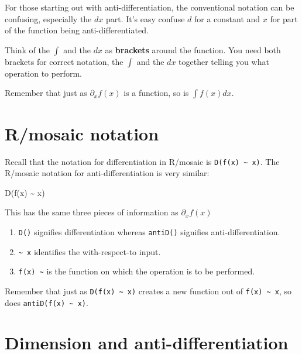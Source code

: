 \documentclass[
  letterpaper,
  DIV=11,
  numbers=noendperiod,
  oneside]{scrreprt}
\newenvironment{Shaded}{\begin{snugshade}}{\end{snugshade}}
\newcommand{\FunctionTok}[1]{\textcolor[rgb]{0.28,0.35,0.67}{#1}}
\newcommand{\NormalTok}[1]{\textcolor[rgb]{0.00,0.46,0.62}{#1}}
\newcommand{\SpecialCharTok}[1]{\textcolor[rgb]{0.37,0.37,0.37}{#1}}
\providecommand{\tightlist}{%
  \setlength{\itemsep}{0pt}\setlength{\parskip}{0pt}}
\begin{document}
For those starting out with anti-differentiation, the conventional
notation can be confusing, especially the \(dx\) part. It's easy confuse
\(d\) for a constant and \(x\) for part of the function being
anti-differentiated.

Think of the \(\int\) and the \(dx\) as \textbf{brackets} around the
function. You need both brackets for correct notation, the \(\int\) and
the \(dx\) together telling you what operation to perform.

Remember that just as \(\partial_x f(x)\) is a function, so is
\(\int f(x) dx\).

\hypertarget{rmosaic-notation}{%
\section{R/mosaic notation}\label{rmosaic-notation}}

Recall that the notation for differentiation in R/mosaic is
\texttt{D(f(x)\ \textasciitilde{}\ x)}. The R/mosaic notation for
anti-differentiation is very similar:

\begin{Shaded}
\begin{Highlighting}[]
\FunctionTok{D}\NormalTok{(}\FunctionTok{f}\NormalTok{(x) }\SpecialCharTok{\textasciitilde{}}\NormalTok{ x)}
\end{Highlighting}
\end{Shaded}

This has the same three pieces of information as \(\partial_x f(x)\)

\begin{enumerate}
\def\labelenumi{\arabic{enumi}.}
\tightlist
\item
  \texttt{D()} signifies differentiation whereas \texttt{antiD()}
  signifies anti-differentiation.
\item
  \texttt{\textasciitilde{}\ x} identifies the with-respect-to input.
\item
  \texttt{f(x)\ \textasciitilde{}} is the function on which the
  operation is to be performed.
\end{enumerate}

Remember that just as \texttt{D(f(x)\ \textasciitilde{}\ x)} creates a
new function out of \texttt{f(x)\ \textasciitilde{}\ x}, so does
\texttt{antiD(f(x)\ \textasciitilde{}\ x)}.

\hypertarget{dimension-and-anti-differentiation}{%
\section{Dimension and
anti-differentiation}\label{dimension-and-anti-differentiation}}
\end{document}
